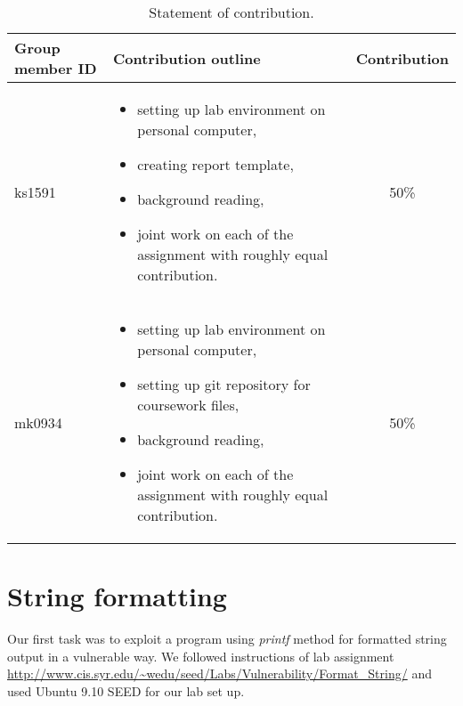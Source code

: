 \documentclass[12pt, a4paper, pdflatex]{article}
\begin{document}
\begin{center}
  \begin{table}[h]
    \begin{tabular}{ l | p{8.5cm} | c }
      Group member ID & Contribution outline & Contribution \\
      \hline
      ks1591 &
      \begin{itemize}
        \item setting up lab environment on personal computer,
        \item creating report template,
        \item background reading,
        \item joint work on each of the assignment with roughly equal contribution.
      \end{itemize}
      & 50\% \\
      mk0934 &
      \begin{itemize}
        \item setting up lab environment on personal computer,
        \item setting up git repository for coursework files,
        \item background reading,
        \item joint work on each of the assignment with roughly equal contribution.
      \end{itemize}
      & 50\% \\
    \end{tabular}
    \caption{Statement of contribution.\label{tab:SoC}}
  \end{table}
\end{center}

\section{String formatting}

Our first task was to exploit a program using \emph{printf} method for formatted string output in a vulnerable way. We followed instructions of lab assignment  \url{http://www.cis.syr.edu/~wedu/seed/Labs/Vulnerability/Format_String/}
and used Ubuntu 9.10 SEED for our lab set up.
\end{document}
